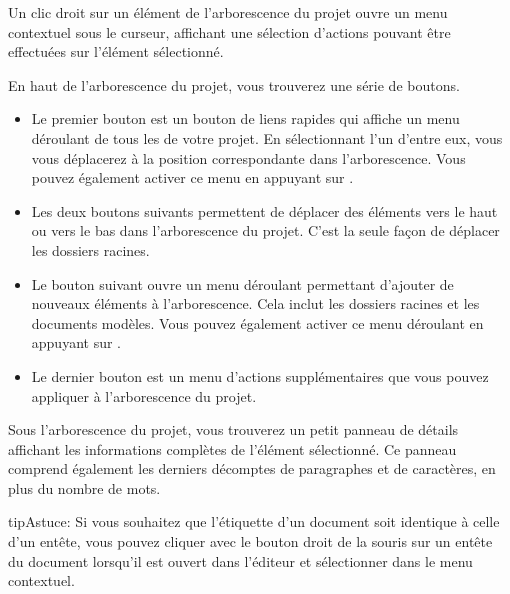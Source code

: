 \documentclass[a4paper,11pt,french]{sphinxmanual}
\begin{document}
\sphinxAtStartPar
Un clic droit sur un élément de l’arborescence du projet ouvre un menu contextuel sous le curseur, affichant une sélection d’actions pouvant être effectuées sur l’élément sélectionné.

\sphinxAtStartPar
En haut de l’arborescence du projet, vous trouverez une série de boutons.
\begin{itemize}
\item {} 
\sphinxAtStartPar
Le premier bouton est un bouton de liens rapides qui affiche un menu déroulant de tous les {\hyperref[\detokenize{int_glossary:term-Root-Folder}]{}} de votre projet. En sélectionnant l’un d’entre eux, vous vous déplacerez à la position correspondante dans l’arborescence. Vous pouvez également activer ce menu en appuyant sur .

\item {} 
\sphinxAtStartPar
Les deux boutons suivants permettent de déplacer des éléments vers le haut ou vers le bas dans l’arborescence du projet. C’est la seule façon de déplacer les dossiers racines.

\item {} 
\sphinxAtStartPar
Le bouton suivant ouvre un menu déroulant permettant d’ajouter de nouveaux éléments à l’arborescence. Cela inclut les dossiers racines et les documents modèles. Vous pouvez également activer ce menu déroulant en appuyant sur .

\item {} 
\sphinxAtStartPar
Le dernier bouton est un menu d’actions supplémentaires que vous pouvez appliquer à l’arborescence du projet.

\end{itemize}

\sphinxAtStartPar
Sous l’arborescence du projet, vous trouverez un petit panneau de détails affichant les informations complètes de l’élément sélectionné. Ce panneau comprend également les derniers décomptes de paragraphes et de caractères, en plus du nombre de mots.

\begin{sphinxadmonition}{tip}{Astuce:}
\sphinxAtStartPar
Si vous souhaitez que l’étiquette d’un document soit identique à celle d’un en\sphinxhyphen{}tête, vous pouvez cliquer avec le bouton droit de la souris sur un en\sphinxhyphen{}tête du document lorsqu’il est ouvert dans l’éditeur et sélectionner  dans le menu contextuel.
\end{sphinxadmonition}
\end{document}
